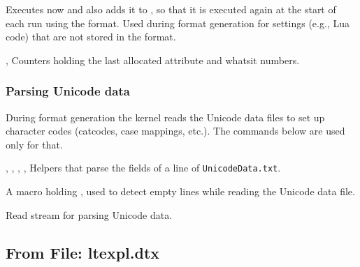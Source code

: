 \documentclass{l3in2edoc}
\begin{document}
\begin{function}[]
  {
    \now@and@everyjob
  }
  \begin{syntax}
     
  \end{syntax}
  Executes  now and also adds it to , so that
  it is executed again at the start of each run using the format.
  Used during format generation for settings (e.g., Lua code) that are
  not stored in the format.
\end{function}





\begin{variable}[int]
  {
    \e@alloc@attribute@count,
    \e@alloc@whatsit@count
  }
  Counters holding the last allocated attribute and whatsit numbers.
\end{variable}




\subsubsection{Parsing Unicode data}

During format generation the kernel reads the Unicode data files to
set up character codes (catcodes, case mappings, etc.). The commands
below are used only for that.

\begin{function}[int]
  {
    \parseunicodedataI,
    \parseunicodedataII,
    \parseunicodedataIII,
    \parseunicodedataIV,
    \parseunicodedataV
  }
  Helpers that parse the fields of a line of \texttt{UnicodeData.txt}.
\end{function}



\begin{function}[int]
  {
    \storedpar
  }
  A macro holding , used to detect empty lines while reading
  the Unicode data file.
\end{function}



\begin{function}[int]
  {
    \unicoderead
  }
  Read stream for parsing Unicode data.
\end{function}



\subsection{From File: ltexpl.dtx}
\end{document}
